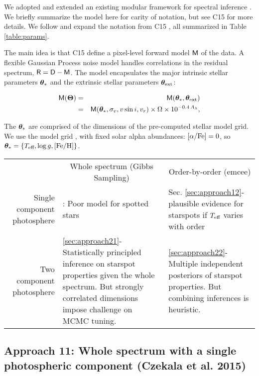 \documentclass[onecolumn]{emulateapj}%
\newcommand{\iancze}{{\sc C15 }}
\begin{document}

We adopted and extended an existing modular framework for spectral inference \citep[][hereafter \iancze]{2015ApJ...812..128C}.  We briefly summarize the model here for carity of notation, but see \iancze for more details.  We follow and expand the notation from \iancze, all summarized in Table \ref{table:params}. 

The main idea is that \iancze define a pixel-level forward model $\mathsf{M}$ of the data.  A flexible Gaussian Process noise model handles correlations in the residual spectrum, $\mathsf{R}= \mathsf{D} - \mathsf{M}$.  The model encapsulates the major intrinsic stellar parameters ${\bm \theta}_{\ast}$ and the extrinsic stellar parameters ${\bm \theta}_{\rm ext}$:

\begin{eqnarray} \label{eqn:scaling}
\mathsf{M}({\bm \Theta}) &=& \mathsf{M}({\bm \theta}_{\ast}, {\bm \theta}_{\rm ext}) \\
         &=& \mathsf{M}({\bm \theta}_{\ast}, \sigma_v, v\sin{i}, v_r) \times \Omega \times 10^{-0.4\,A_{\lambda}}, \nonumber
\end{eqnarray}

The ${\bm \theta}_{\ast}$ are comprised of the dimensions of the pre-computed stellar model grid.  We use the \PHOENIX model grid \citep{2013A&A...553A...6H}, with fixed solar alpha abundances: $[\alpha/{\rm Fe}] = 0$, so ${\bm \theta}_{\ast} = \{T_\textrm{eff}, \log g, [{\rm Fe}/{\rm H}] \}$.


\begin{tabular}{ r| p{5cm} | p{5cm} | }
\multicolumn{1}{r}{}
 &  \multicolumn{1}{c}{Whole spectrum (Gibbs Sampling)}
 & \multicolumn{1}{c}{Order-by-order (emcee)} \\
\cline{2-3}
Single component photosphere & \citet{2015ApJ...812..128C}: Poor model for spotted stars & Sec. \ref{sec:approach12}- plausible evidence for starspots if $T_\textrm{eff}$ varies with order \\
\cline{2-3}
Two component photosphere & \ref{sec:approach21}- Statistically principled inference on starspot properties given the whole spectrum.  But strongly correlated dimensions impose challenge on MCMC tuning. & \ref{sec:approach22}- Multiple independent posteriors of starspot properties.  But combining inferences is heuristic.  \\
\cline{2-3}
\end{tabular}

\subsection{Approach 11: Whole spectrum with a single photospheric component (Czekala et al. 2015)}
\end{document}
